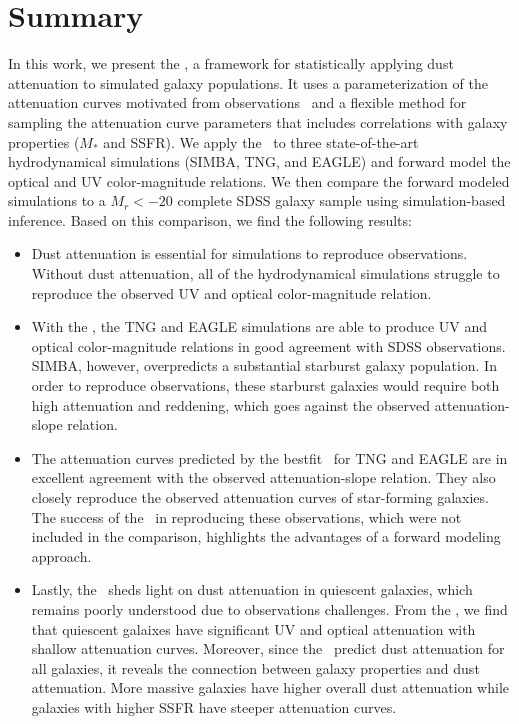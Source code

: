 \section{Summary}
In this work, we present the \eda, a framework for statistically applying dust
attenuation to simulated galaxy populations. It uses a parameterization of 
the attenuation curves motivated from observations~\citep{noll2009} and a
flexible method for sampling the attenuation curve parameters that includes
correlations with galaxy properties ($M_*$ and SSFR). We apply the \eda~to 
three state-of-the-art hydrodynamical simulations (SIMBA, TNG, and EAGLE) and
forward model the optical and UV color-magnitude relations. We then compare
the forward modeled simulations to a $M_r < -20$ complete SDSS galaxy sample  
using simulation-based inference. Based on this comparison, we find the
following results: 

\begin{itemize}
    \item Dust attenuation is essential for simulations to reproduce observations.
        Without dust attenuation, all of the hydrodynamical simulations struggle
        to reproduce the observed UV and optical color-magnitude relation. 
    \item With the \eda, the TNG and EAGLE simulations are able to produce UV and
        optical color-magnitude relations in good agreement with SDSS observations. 
        SIMBA, however, overpredicts a substantial starburst galaxy population.
        In order to reproduce observations, these starburst galaxies would require
        both high attenuation and reddening, which goes against the observed 
        attenuation-slope relation. 
    \item The attenuation curves predicted by the bestfit \eda~for TNG and
        EAGLE are in excellent agreement with the observed attenuation-slope
        relation. They also closely reproduce the observed attenuation curves
        of star-forming galaxies. The success of the \eda~in reproducing these
        observations, which were not included in the comparison, highlights the 
        advantages of a forward modeling approach. 
    \item Lastly, the \eda~sheds light on dust attenuation in quiescent
        galaxies, which remains poorly understood due to observations
        challenges. From the \eda, we find that quiescent galaixes have
        significant UV and optical attenuation with shallow attenuation curves.
        Moreover, since the \eda~predict dust attenuation for all galaxies, it
        reveals the connection between galaxy properties and
        dust attenuation. More massive galaxies have higher overall dust
        attenuation while galaxies with higher SSFR have steeper attenuation
        curves. 
\end{itemize}

